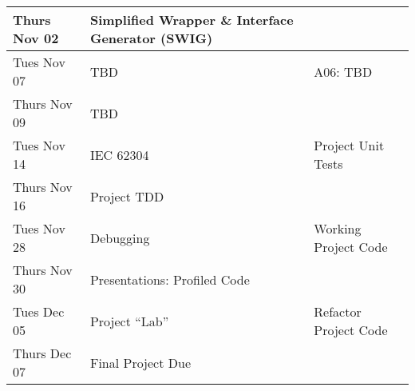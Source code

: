 \begin{longtable}[c]{|l|l|l|}
    Thurs Nov 02    & Simplified Wrapper \& Interface Generator (SWIG) & \\
    \hline
    Tues Nov 07     & TBD & A06: TBD \\
    Thurs Nov 09    & TBD & \\
    \hline
    Tues Nov 14     & IEC 62304 & Project Unit Tests \\
    Thurs Nov 16    & Project TDD & \\
    \hline
    Tues Nov 28     & Debugging & Working Project Code \\
    Thurs Nov 30    & Presentations: Profiled Code & \\
    \hline
    Tues Dec 05     & Project ``Lab'' & Refactor Project Code \\
    Thurs Dec 07    & Final Project Due & \\
    \hline

\end{longtable}
